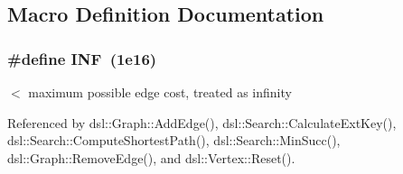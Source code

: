 \subsection{Macro Definition Documentation}
\subsubsection[{I\-N\-F}]{\setlength{\rightskip}{0pt plus 5cm}\#define I\-N\-F~(1e16)}\label{vertex_8h_a12c2040f25d8e3a7b9e1c2024c618cb6}


$<$ maximum possible edge cost, treated as infinity 



Referenced by dsl\-::\-Graph\-::\-Add\-Edge(), dsl\-::\-Search\-::\-Calculate\-Ext\-Key(), dsl\-::\-Search\-::\-Compute\-Shortest\-Path(), dsl\-::\-Search\-::\-Min\-Succ(), dsl\-::\-Graph\-::\-Remove\-Edge(), and dsl\-::\-Vertex\-::\-Reset().

